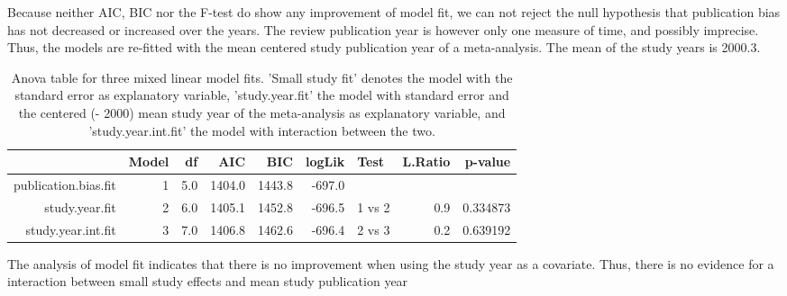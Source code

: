 \documentclass[11pt,a4paper,twoside]{book}\usepackage[]{graphicx}\usepackage[]{color}
\begin{document}
Because neither AIC, BIC nor the F-test do show any improvement of model fit, we can not reject the null hypothesis that publication bias has not decreased or increased over the years. The review publication year is however only one measure of time, and possibly imprecise. Thus, the models are re-fitted with the mean centered study publication year of a meta-analysis. The mean of the study years is 2000.3.

\begin{table}[ht]
\centering
\begingroup\scriptsize
\begin{tabular}{rrrrrrlrr}
  \hline
 & Model & df & AIC & BIC & logLik & Test & L.Ratio & p-value \\ 
  \hline
publication.bias.fit &  1 & 5.0 & 1404.0 & 1443.8 & -697.0 &  &  &  \\ 
  study.year.fit &  2 & 6.0 & 1405.1 & 1452.8 & -696.5 & 1 vs 2 & 0.9 & 0.334873 \\ 
  study.year.int.fit &  3 & 7.0 & 1406.8 & 1462.6 & -696.4 & 2 vs 3 & 0.2 & 0.639192 \\ 
   \hline
\end{tabular}
\endgroup
\caption{Anova table for three mixed linear model fits. 'Small study fit' denotes the model with the standard error as explanatory variable, 'study.year.fit' the model with standard error and the centered (- 2000) mean study year of the meta-analysis as explanatory variable, and 'study.year.int.fit' the model with interaction between the two.} 
\label{anova.lme}
\end{table}


The analysis of model fit indicates that there is no improvement when using the study year as a covariate. Thus, there is no evidence for a interaction between small study effects and mean study publication year
\end{document}
